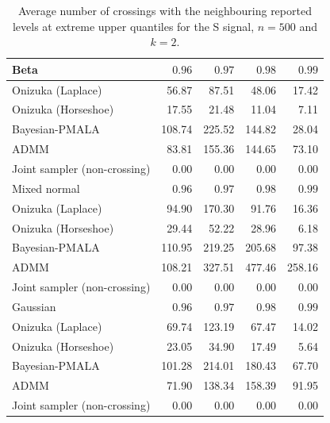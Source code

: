 \begin{table}[!htbp]
\centering
\small
\caption{Average number of crossings with the neighbouring reported levels at extreme upper quantiles for the S signal, $n=500$ and $k=2$.}
\label{tab:s_ext_upper_cross_nb}
\begin{tabular}{lrrrr}
\toprule
Beta & $0.96$ & $0.97$ & $0.98$ & $0.99$ \\
\midrule
Onizuka (Laplace) & 56.87 & 87.51 & 48.06 & 17.42 \\
Onizuka (Horseshoe) & 17.55 & 21.48 & 11.04 & 7.11 \\
Bayesian-PMALA & 108.74 & 225.52 & 144.82 & 28.04 \\
ADMM & 83.81 & 155.36 & 144.65 & 73.10 \\
Joint sampler (non-crossing) & 0.00 & 0.00 & 0.00 & 0.00 \\
\midrule
Mixed normal & $0.96$ & $0.97$ & $0.98$ & $0.99$ \\
\midrule
Onizuka (Laplace) & 94.90 & 170.30 & 91.76 & 16.36 \\
Onizuka (Horseshoe) & 29.44 & 52.22 & 28.96 & 6.18 \\
Bayesian-PMALA & 110.95 & 219.25 & 205.68 & 97.38 \\
ADMM & 108.21 & 327.51 & 477.46 & 258.16 \\
Joint sampler (non-crossing) & 0.00 & 0.00 & 0.00 & 0.00 \\
\midrule
Gaussian & $0.96$ & $0.97$ & $0.98$ & $0.99$ \\
\midrule
Onizuka (Laplace) & 69.74 & 123.19 & 67.47 & 14.02 \\
Onizuka (Horseshoe) & 23.05 & 34.90 & 17.49 & 5.64 \\
Bayesian-PMALA & 101.28 & 214.01 & 180.43 & 67.70 \\
ADMM & 71.90 & 138.34 & 158.39 & 91.95 \\
Joint sampler (non-crossing) & 0.00 & 0.00 & 0.00 & 0.00 \\
\bottomrule
\end{tabular}
\end{table}

